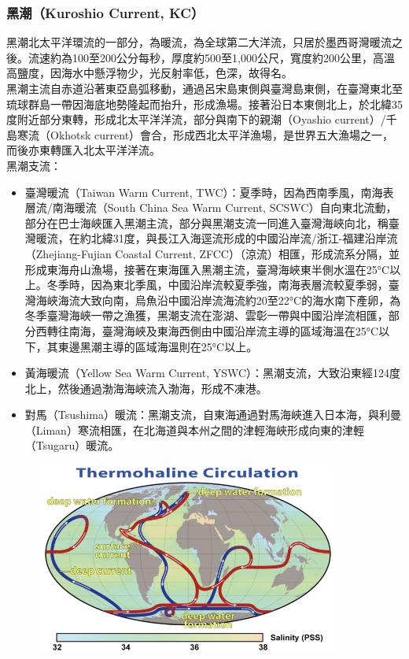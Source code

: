 \documentclass[a4paper,12pt]{report}
\begin{document}
\subsubsection{黑潮（Kuroshio Current, KC）}
黑潮北太平洋環流的一部分，為暖流，為全球第二大洋流，只居於墨西哥灣暖流之後。流速約為100至200公分每秒，厚度約500至1,000公尺，寬度約200公里，高溫高鹽度，因海水中懸浮物少，光反射率低，色深，故得名。\\
黑潮主流自赤道沿著東亞島弧移動，通過呂宋島東側與臺灣島東側，在臺灣東北至琉球群島一帶因海底地勢隆起而抬升，形成漁場。接著沿日本東側北上，於北緯35度附近部分東轉，形成北太平洋洋流，部分與南下的親潮（Oyashio current）/千島寒流（Okhotsk current）會合，形成西北太平洋漁場，是世界五大漁場之一，而後亦東轉匯入北太平洋洋流。\\
黑潮支流：
\begin{itemize}
\item 臺灣暖流（Taiwan Warm Current, TWC）：夏季時，因為西南季風，南海表層流/南海暖流（South China Sea Warm Current, SCSWC）自向東北流動，部分在巴士海峽匯入黑潮主流，部分與黑潮支流一同進入臺灣海峽向北，稱臺灣暖流，在約北緯31度，與長江入海逕流形成的中國沿岸流/浙江-福建沿岸流（Zhejiang-Fujian Coastal Current, ZFCC）（涼流）相匯，形成流系分隔，並形成東海舟山漁場，接著在東海匯入黑潮主流，臺灣海峽東半側水溫在25°C以上。冬季時，因為東北季風，中國沿岸流較夏季強，南海表層流較夏季弱，臺灣海峽海流大致向南，烏魚沿中國沿岸流海流約20至22°C的海水南下產卵，為冬季臺灣海峽一帶之漁獲，黑潮支流在澎湖、雲彰一帶與中國沿岸流相匯，部分西轉往南海，臺灣海峽及東海西側由中國沿岸流主導的區域海溫在25°C以下，其東邊黑潮主導的區域海溫則在25°C以上。
\item 黃海暖流（Yellow Sea Warm Current, YSWC）：黑潮支流，大致沿東經124度北上，然後通過渤海海峽流入渤海，形成不凍港。
\item 對馬（Tsushima）暖流：黑潮支流，自東海通過對馬海峽進入日本海，與利曼（Liman）寒流相匯，在北海道與本州之間的津輕海峽形成向東的津輕（Tsugaru）暖流。
\end{itemize}
\begin{figure}[H]
    \centering
    \includegraphics[width=0.9\textwidth]{THC.png}
\end{figure}\FB
\end{document}

